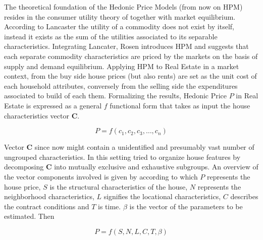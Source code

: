 \documentclass[
  12pt,
  a4paper,
  oneside]{book}
\begin{document}
The theoretical foundation of the Hedonic Price Models (from now on HPM) resides in the consumer utility theory of \citet{Lancaster} together with \citet{Rosen} market equilibrium. According to Lancaster the utility of a commodity does not exist by itself, instead it exists as the sum of the utilities associated to its separable characteristics. Integrating Lancater, Rosen introduces HPM and suggests that each separate commodity characteristics are priced by the markets on the basis of supply and demand equilibrium. Applying HPM to Real Estate in a market context, from the buy side house prices (but also rents) are set as the unit cost of each household attributes, conversely from the selling side the expenditures associated to build of each them.
Formalizing the results, Hedonic Price \(P\) in Real Estate is expressed as a general \(f\) functional form that takes as input the house characteristics vector \(\mathbf{C}\).

\[P=f\left(c_{1}, c_{2}, c_{3}, \ldots, c_{n}\right)\]

Vector \(\mathbf{C}\) since now might contain a unidentified and presumably vast number of ungrouped characteristics. In this setting \citet{Malpezzi} tried to organize house features by decomposing \(\mathbf{C}\) into mutually exclusive and exhaustive subgroups. An overview of the vector components involved is given by \citet{Ling} according to which \(P\) represents the house price, \(S\) is the structural characteristics of the house, \(N\) represents the neighborhood characteristics, \(L\) signifies the locational characteristics, \(C\) describes the contract conditions and \(T\) is time. \(\beta\) is the vector of the parameters to be estimated. Then

\[P=f\left(S, N, L, C, T, \beta\right)\]
\end{document}
